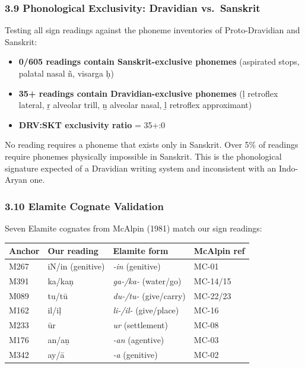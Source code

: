 \documentclass[
  11pt,
]{article}
\newcounter{none} %
\providecommand{\tightlist}{%
  \setlength{\itemsep}{0pt}\setlength{\parskip}{0pt}}
\begin{document}
\subsubsection{3.9 Phonological Exclusivity: Dravidian
vs.~Sanskrit}\label{phonological-exclusivity-dravidian-vs.-sanskrit}

Testing all sign readings against the phoneme inventories of
Proto-Dravidian and Sanskrit:

\begin{itemize}
\tightlist
\item
  \textbf{0/605 readings contain Sanskrit-exclusive phonemes} (aspirated
  stops, palatal nasal ñ, visarga ḥ)
\item
  \textbf{35+ readings contain Dravidian-exclusive phonemes} (ḷ
  retroflex lateral, ṟ alveolar trill, ṉ alveolar nasal, ḻ retroflex
  approximant)
\item
  \textbf{DRV:SKT exclusivity ratio} = 35+:0
\end{itemize}

No reading requires a phoneme that exists only in Sanskrit. Over 5\% of
readings require phonemes physically impossible in Sanskrit. This is the
phonological signature expected of a Dravidian writing system and
inconsistent with an Indo-Aryan one.

\subsubsection{3.10 Elamite Cognate
Validation}\label{elamite-cognate-validation}

Seven Elamite cognates from McAlpin (1981) match our sign readings:

{\def\LTcaptype{none} %
\begin{longtable}[]{@{}llll@{}}
\toprule\noalign{}
Anchor & Our reading & Elamite form & McAlpin ref \\
\midrule\noalign{}
\endhead
\bottomrule\noalign{}
\endlastfoot
M267 & iN/in (genitive) & \emph{-in} (genitive) & MC-01 \\
M391 & ka/kaṇ & \emph{ga-/ka-} (water/go) & MC-14/15 \\
M089 & tu/tū & \emph{du-/tu-} (give/carry) & MC-22/23 \\
M162 & il/iḷ & \emph{li-/il-} (give/place) & MC-16 \\
M233 & ūr & \emph{ur} (settlement) & MC-08 \\
M176 & an/aṇ & \emph{-an} (agentive) & MC-03 \\
M342 & ay/ā & \emph{-a} (genitive) & MC-02 \\
\end{longtable}
}
\end{document}
